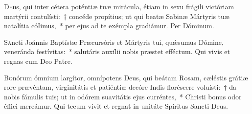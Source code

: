 \documentclass[vesperale_romanum.tex]{subfiles}
\begin{document}
\oratio

\lettrine{D}{e}us, qui inter cétera poténtiæ tuæ mirácula, étiam in sexu frágili vi\-ctóriam martýrii contulísti:~† concéde propítius; ut qui beatæ Sabinæ Mártyris tuæ natalítia cóIimus,~* per ejus ad te exémpla gradiámur. Per Dóminum.









\admagnificat



\oratio

\lettrine{S}{a}ncti Joánnis Baptístæ Præcursóris et Mártyris tui, quǽsumus Dómine, veneránda festívitas:~* salutáris auxílii nobis præstet effé\-ctum. Qui vivis et regnas cum Deo Patre.


\myrule


\duplex


\oratio

\lettrine{B}{o}nórum ó\-mnium largítor, omnípotens Deus, qui beátam Rosam, cæléstis grátiæ rore prævéntam, virginitátis et patiéntiæ decóre Indis floréscere voluísti:~† da nobis fámulis tuis; ut in odórem suavitátis ejus curréntes,~* Christi bonus odor éffici mereámur. Qui tecum vivit et regnat in unitáte Spíritus San\-cti Deus.

\end{document}
